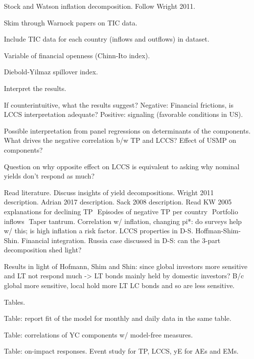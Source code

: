 \documentclass[12pt]{article}
\begin{document}
\begin{todolist}
\begin{todolist}
		\item Stock and Watson inflation decomposition. Follow Wright 2011.
		\item Skim through Warnock papers on TIC data.
		\item Include TIC data for each country (inflows and outflows) in dataset.
		\item Variable of financial openness (Chinn-Ito index).
		\item Diebold-Yilmaz spillover index.
	\end{todolist}
	\item Interpret the results.
	\begin{todolist}
		\item If counterintuitive, what the results suggest? Negative: Financial frictions, is LCCS interpretation adequate? Positive: signaling (favorable conditions in US).
		\item Possible interpretation from panel regressions on determinants of the components. What drives the negative correlation b/w TP and LCCS? Effect of USMP on components?
		\item Question on why opposite effect on LCCS is equivalent to asking why nominal yields don't respond as much?
		\item Read literature. Discuss insights of yield decompositions. Wright 2011 description. Adrian 2017 description. Sack 2008 description. Read KW 2005 explanations for declining TP \(<->\) Episodes of negative TP per country \(<->\) Portfolio inflows \(<->\) Taper tantrum. Correlation w/ inflation, changing pi*: do surveys help w/ this; is high inflation a risk factor. LCCS properties in D-S. Hoffman-Shim-Shin. Financial integration. Russia case discussed in D-S: can the 3-part decomposition shed light?
		\item Results in light of Hofmann, Shim and Shin: since global investors more sensitive and LT not respond much -> LT bonds mainly held by domestic investors? B/c global more sensitive, local hold more LT LC bonds and so are less sensitive.
	\end{todolist}
	
	\item Tables.
	\begin{todolist}
		\item Table: report fit of the model for monthly and daily data in the same table.
		\item Table: correlations of YC components w/ model-free measures.
		\item Table: on-impact responses. Event study for TP, LCCS, yE for AEs and EMs.
	\end{todolist}


\end{todolist}
\end{document}
